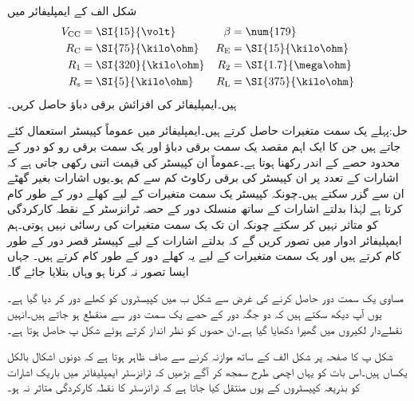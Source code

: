  
شکل  الف کے ایمپلیفائر میں
\begin{align*}
V_{\textup{CC}} &=\SI{15}{\volt} & \beta&=\num{179}\\
R_{\textup{C}} &=\SI{75}{\kilo \ohm} &  R_{\textup{E}} &=\SI{15}{\kilo \ohm}\\
R_{\textup{1}} &=\SI{320}{\kilo \ohm} & R_{\textup{2}} &=\SI{1.7}{\mega \ohm}\\
R_{\textup{s}} &=\SI{5}{\kilo \ohm} & R_{\textup{L}} &=\SI{375}{\kilo \ohm}
\end{align*}
ہیں۔ایمپلیفائر کی افزائش برقی دباؤ   حاصل کریں۔

حل:پہلے یک سمت متغیرات حاصل کرتے ہیں۔ایمپلیفائر میں عموماً کپیسٹر استعمال کئے جاتے ہیں جن کا ایک اہم مقصد یک سمت برقی دباؤ اور یک سمت برقی رو کو دور کے محدود حصے کے اندر رکھنا ہوتا ہے۔عموماً ان کپیسٹر کی قیمت اتنی رکھی جاتی ہے کہ اشارات کے تعدد پر ان کپیسٹر کی برقی رکاوٹ کم سے کم ہو۔یوں اشارات بغیر گھٹے ان سے گزر سکتے ہیں۔چونکہ کپیسٹر یک سمت متغیرات کے لیے کھلے دور کے طور کام کرتا ہے لہٰذا بدلتے اشارات کے ساتھ منسلک دور کے حصہ ٹرانزسٹر کے نقطہ کارکردگی کو متاثر نہیں کر سکتے چونکہ ان تک یک سمت متغیرات کی رسائی نہیں ہوتی۔ہم ایمپلیفائر ادوار میں تصور کریں گے کہ بدلتے اشارات کے لیے کپیسٹر قصر دور کے طور کام کرتے ہیں اور یک سمت متغیرات کے لیے یہ کھلے دور کے طور کام کرتے ہیں۔ جہاں ایسا تصور نہ کرنا ہو وہاں بتلایا جائے گا۔

مساوی یک سمت دور حاصل کرنے کی غرض سے شکل  ب میں کپیسٹروں کو کھلے دور کر دیا گیا ہے۔یوں آپ دیکھ سکتے ہیں کہ دو جگہ دور کے حصے یک سمت دور سے منقطع ہو جاتے ہیں۔انہیں نقطےدار لکیروں میں گھیرا دکھایا گیا ہے۔ان حصوں کو نظر انداز کرتے ہوئے شکل  پ حاصل ہوتا ہے۔

شکل  پ کا صفحہ \pageref{شکل_ایک_عدد_پیداکار_برقی_دباو_سے_مائل}  پر شکل  الف کے ساتھ موازنہ کرنے سے صاف ظاہر ہوتا ہے کہ دونوں اشکال بالکل یکساں ہیں۔اس بات کو یہاں اچھی طرح سمجھ کر آگے بڑھیں کہ ٹرانزسٹر ایمپلیفائر میں باریک اشارات کو بذریعہ کپیسٹروں کے یوں منتقل کیا جاتا ہے کہ ٹرانزسٹر کا نقطہ کارکردگی متاثر نہ ہو۔

